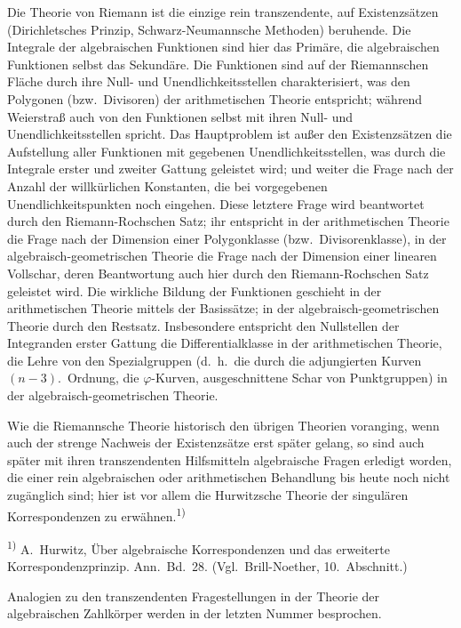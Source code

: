 \documentclass[12pt,a4paper]{article}
\begin{document}
Die Theorie von Riemann ist die einzige rein transzendente, auf Existenzs\"atzen (Dirichletsches Prinzip, Schwarz-Neumannsche Methoden) beruhende. Die Integrale der algebraischen Funktionen sind hier das Prim\"are, die algebraischen Funktionen selbst das Sekund\"are. Die Funktionen sind auf der Riemannschen Fl\"ache durch ihre Null- und Unendlichkeitsstellen charakterisiert, was den Polygonen (bzw.\ Divisoren) der arithmetischen Theorie entspricht; w\"ahrend Weierstra\ss{} auch von den Funktionen selbst mit ihren Null- und Unendlichkeitsstellen spricht. Das Hauptproblem ist au\ss{}er den Existenzs\"atzen die Aufstellung aller Funktionen mit gegebenen Unendlichkeitsstellen, was durch die Integrale erster und zweiter Gattung geleistet wird; und weiter die Frage nach der Anzahl der willk\"urlichen Konstanten, die bei vorgegebenen Unendlichkeitspunkten noch eingehen. Diese letztere Frage wird beantwortet durch den Riemann-Rochschen Satz; ihr entspricht in der arithmetischen Theorie die Frage nach der Dimension einer Polygonklasse (bzw.\ Divisorenklasse), in der algebraisch-geometrischen Theorie die Frage nach der Dimension einer linearen Vollschar, deren Beantwortung auch hier durch den Riemann-Rochschen Satz geleistet wird. Die wirkliche Bildung der Funktionen geschieht in der arithmetischen Theorie mittels der Basiss\"atze; in der algebraisch-geometrischen Theorie durch den Restsatz. Insbesondere entspricht den Nullstellen der Integranden erster Gattung die Differentialklasse in der arithmetischen Theorie, die Lehre von den Spezialgruppen (d.\ h.\ die durch die adjungierten Kurven $(n-3)$.\ Ordnung, die $\varphi$-Kurven, ausgeschnittene Schar von Punktgruppen) in der algebraisch-geometrischen Theorie.

Wie die Riemannsche Theorie historisch den \"ubrigen Theorien voranging, wenn auch der strenge Nachweis der Existenzs\"atze erst sp\"ater gelang, so sind auch sp\"ater mit ihren transzendenten Hilfsmitteln algebraische Fragen erledigt worden, die einer rein algebraischen oder arithmetischen Behandlung bis heute noch nicht zug\"anglich sind; hier ist vor allem die Hurwitzsche Theorie der singul\"aren Korrespondenzen zu erw\"ahnen.\textsuperscript{1)}

\smallskip
\noindent\textsuperscript{1)} A.\ Hurwitz, \"Uber algebraische Korrespondenzen und das erweiterte Korrespondenzprinzip. Ann.\ Bd.\ 28. (Vgl.\ Brill-Noether, 10.\ Abschnitt.)

Analogien zu den transzendenten Fragestellungen in der Theorie der algebraischen Zahlk\"orper werden in der letzten Nummer besprochen.
\end{document}
